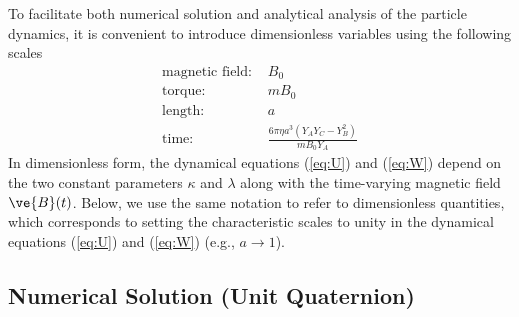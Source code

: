 To facilitate both numerical solution and analytical analysis of the particle dynamics, it is convenient to introduce dimensionless variables using the following scales
\begin{align}
    \text{magnetic field: } & B_0
    \\
    \text{torque: } &  mB_0
    \\
    \text{length: } & a
    \\
    \text{time: } & \frac{6\pi \eta a^3 (Y_A Y_C-Y_B^2)}{m B_0 Y_A}  
\end{align}
In dimensionless form, the dynamical equations (\ref{eq:U}) and (\ref{eq:W}) depend on the  two constant parameters $\kappa$ and $\lambda$ along with the time-varying magnetic field $\ve{B}(t)$. Below, we use the same notation to refer to dimensionless quantities, which corresponds to setting the characteristic scales to unity in the dynamical equations (\ref{eq:U}) and (\ref{eq:W}) (e.g., $a\rightarrow 1$).

\subsection{Numerical Solution (Unit Quaternion)}


